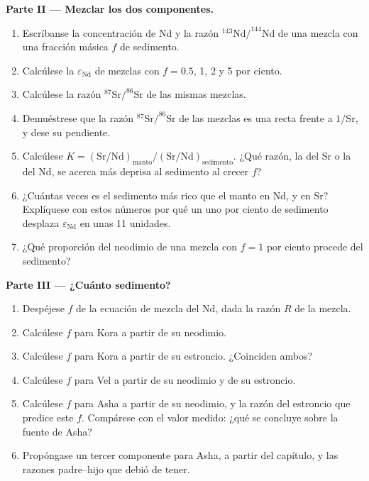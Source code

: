 \begin{problem}
\noindent\textbf{Parte II --- Mezclar los dos componentes.}
\begin{enumerate}[resume]
\item Escríbanse la concentración de Nd y la razón $^{143}\mathrm{Nd}/^{144}\mathrm{Nd}$ de una
mezcla con una fracción másica $f$ de sedimento.
\item Calcúlese la $\varepsilon_{\mathrm{Nd}}$ de mezclas con $f = 0.5$, 1, 2 y 5 por
ciento.
\item Calcúlese la razón $^{87}\mathrm{Sr}/^{86}\mathrm{Sr}$ de las mismas mezclas.
\item Demuéstrese que la razón $^{87}\mathrm{Sr}/^{86}\mathrm{Sr}$ de las mezclas es una recta
frente a $1/\mathrm{Sr}$, y dese su pendiente.
\item Calcúlese $K = (\mathrm{Sr}/\mathrm{Nd})_{\text{manto}}/(\mathrm{Sr}/\mathrm{Nd})_{\text{sedimento}}$.
¿Qué razón, la del Sr o la del Nd, se acerca más deprisa al sedimento al crecer $f$?
\item ¿Cuántas veces es el sedimento más rico que el manto en Nd, y en Sr?
Explíquese con estos números por qué un uno por ciento de sedimento desplaza
$\varepsilon_{\mathrm{Nd}}$ en unas 11 unidades.
\item ¿Qué proporción del neodimio de una mezcla con $f = 1$ por ciento procede del
sedimento?
\end{enumerate}

\noindent\textbf{Parte III --- ¿Cuánto sedimento?}
\begin{enumerate}[resume]
\item Despéjese $f$ de la ecuación de mezcla del Nd, dada la razón $R$ de la mezcla.
\item Calcúlese $f$ para Kora a partir de su neodimio.
\item Calcúlese $f$ para Kora a partir de su estroncio. ¿Coinciden ambos?
\item Calcúlese $f$ para Vel a partir de su neodimio y de su estroncio.
\item Calcúlese $f$ para Asha a partir de su neodimio, y la razón del estroncio que predice
este $f$. Compárese con el valor medido: ¿qué se concluye sobre la fuente
de Asha?
\item Propóngase un tercer componente para Asha, a partir del capítulo, y las
razones padre--hijo que debió de tener.
\end{enumerate}


\end{problem}
